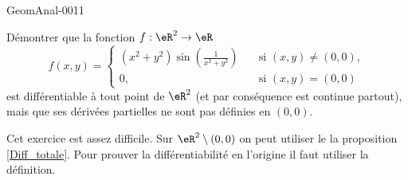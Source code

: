 \begin{corrige}{GeomAnal-0011}

  Démontrer que la fonction $f:\eR^2\to \eR$
  \begin{equation}
  f(x,y)=\left\{  \begin{array}{ll}
      (x^2+y^2)\sin\left(\frac{1}{x^2+y^2}\right)\quad &  \textrm{si } (x,y)\neq(0,0),\\
0, &  \textrm{si } (x,y)=(0,0)
    \end{array}\right.
  \end{equation}
est différentiable à tout point de $\eR^2$ (et par conséquence est continue partout), mais que ses dérivées partielles ne sont pas définies en $(0,0)$.

Cet exercice est assez difficile. Sur $\eR^2\setminus (0,0)$ on peut utiliser le la proposition \ref{Diff_totale}. Pour prouver la différentiabilité en l'origine il faut utiliser la définition.   

\end{corrige}
